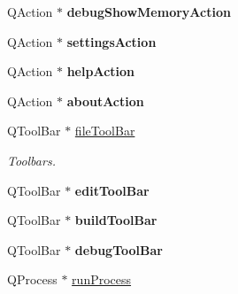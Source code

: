 \begin{DoxyCompactItemize}
\item 
\hypertarget{class_main_window_a2243efbdb97a03e431d2be5d6e6f870d}{}Q\+Action $\ast$ {\bfseries debug\+Show\+Memory\+Action}\label{class_main_window_a2243efbdb97a03e431d2be5d6e6f870d}

\item 
\hypertarget{class_main_window_a54cb5d217f90135a7c366d0b37331493}{}Q\+Action $\ast$ {\bfseries settings\+Action}\label{class_main_window_a54cb5d217f90135a7c366d0b37331493}

\item 
\hypertarget{class_main_window_add8f4264db92b536da73c849e14bd3c7}{}Q\+Action $\ast$ {\bfseries help\+Action}\label{class_main_window_add8f4264db92b536da73c849e14bd3c7}

\item 
\hypertarget{class_main_window_a4bc4ae131d91d1eece03c36fd0c2d3fa}{}Q\+Action $\ast$ {\bfseries about\+Action}\label{class_main_window_a4bc4ae131d91d1eece03c36fd0c2d3fa}

\item 
\hypertarget{class_main_window_a0a352c6d66b7a080fcf558874a7e51d4}{}Q\+Tool\+Bar $\ast$ \hyperlink{class_main_window_a0a352c6d66b7a080fcf558874a7e51d4}{file\+Tool\+Bar}\label{class_main_window_a0a352c6d66b7a080fcf558874a7e51d4}

\begin{DoxyCompactList}\small\item\em Toolbars. \end{DoxyCompactList}\item 
\hypertarget{class_main_window_a58acbb5fd760cdd016969a446abb83ca}{}Q\+Tool\+Bar $\ast$ {\bfseries edit\+Tool\+Bar}\label{class_main_window_a58acbb5fd760cdd016969a446abb83ca}

\item 
\hypertarget{class_main_window_aa6e68a631578e55575254dd029ae8145}{}Q\+Tool\+Bar $\ast$ {\bfseries build\+Tool\+Bar}\label{class_main_window_aa6e68a631578e55575254dd029ae8145}

\item 
\hypertarget{class_main_window_aa3194e1aeded7359e3b63db79ad73a71}{}Q\+Tool\+Bar $\ast$ {\bfseries debug\+Tool\+Bar}\label{class_main_window_aa3194e1aeded7359e3b63db79ad73a71}

\item 
\hypertarget{class_main_window_a087957e06d8d297f08221e508dfb326e}{}Q\+Process $\ast$ \hyperlink{class_main_window_a087957e06d8d297f08221e508dfb326e}{run\+Process}\label{class_main_window_a087957e06d8d297f08221e508dfb326e}


\end{DoxyCompactItemize}
